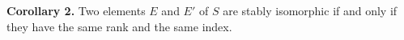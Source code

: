 \textbf{Corollary 2.} Two elements $E$ and $E'$ of $S$ are stably isomorphic if and only if they have the same rank and the same index.
